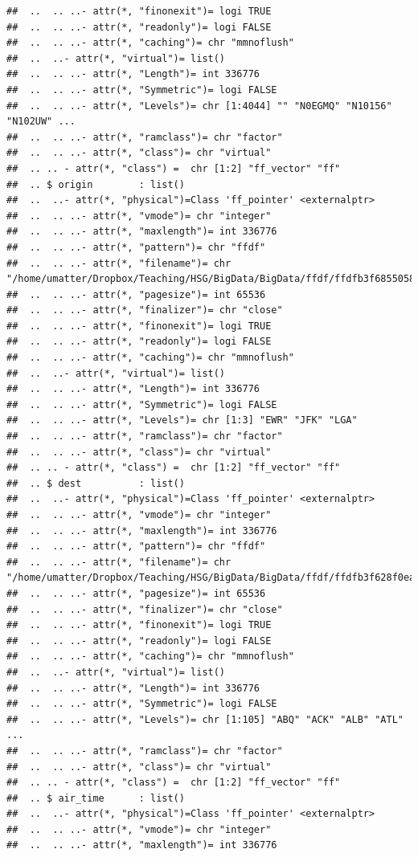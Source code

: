 \documentclass[
  12pt,
]{style/krantz}
\begin{document}
\begin{verbatim}
##  ..  .. ..- attr(*, "finonexit")= logi TRUE
##  ..  .. ..- attr(*, "readonly")= logi FALSE
##  ..  .. ..- attr(*, "caching")= chr "mmnoflush"
##  ..  ..- attr(*, "virtual")= list()
##  ..  .. ..- attr(*, "Length")= int 336776
##  ..  .. ..- attr(*, "Symmetric")= logi FALSE
##  ..  .. ..- attr(*, "Levels")= chr [1:4044] "" "N0EGMQ" "N10156" "N102UW" ...
##  ..  .. ..- attr(*, "ramclass")= chr "factor"
##  ..  .. ..- attr(*, "class")= chr "virtual"
##  .. .. - attr(*, "class") =  chr [1:2] "ff_vector" "ff"
##  .. $ origin        : list()
##  ..  ..- attr(*, "physical")=Class 'ff_pointer' <externalptr> 
##  ..  .. ..- attr(*, "vmode")= chr "integer"
##  ..  .. ..- attr(*, "maxlength")= int 336776
##  ..  .. ..- attr(*, "pattern")= chr "ffdf"
##  ..  .. ..- attr(*, "filename")= chr "/home/umatter/Dropbox/Teaching/HSG/BigData/BigData/ffdf/ffdfb3f68550586.ff"
##  ..  .. ..- attr(*, "pagesize")= int 65536
##  ..  .. ..- attr(*, "finalizer")= chr "close"
##  ..  .. ..- attr(*, "finonexit")= logi TRUE
##  ..  .. ..- attr(*, "readonly")= logi FALSE
##  ..  .. ..- attr(*, "caching")= chr "mmnoflush"
##  ..  ..- attr(*, "virtual")= list()
##  ..  .. ..- attr(*, "Length")= int 336776
##  ..  .. ..- attr(*, "Symmetric")= logi FALSE
##  ..  .. ..- attr(*, "Levels")= chr [1:3] "EWR" "JFK" "LGA"
##  ..  .. ..- attr(*, "ramclass")= chr "factor"
##  ..  .. ..- attr(*, "class")= chr "virtual"
##  .. .. - attr(*, "class") =  chr [1:2] "ff_vector" "ff"
##  .. $ dest          : list()
##  ..  ..- attr(*, "physical")=Class 'ff_pointer' <externalptr> 
##  ..  .. ..- attr(*, "vmode")= chr "integer"
##  ..  .. ..- attr(*, "maxlength")= int 336776
##  ..  .. ..- attr(*, "pattern")= chr "ffdf"
##  ..  .. ..- attr(*, "filename")= chr "/home/umatter/Dropbox/Teaching/HSG/BigData/BigData/ffdf/ffdfb3f628f0eaa8.ff"
##  ..  .. ..- attr(*, "pagesize")= int 65536
##  ..  .. ..- attr(*, "finalizer")= chr "close"
##  ..  .. ..- attr(*, "finonexit")= logi TRUE
##  ..  .. ..- attr(*, "readonly")= logi FALSE
##  ..  .. ..- attr(*, "caching")= chr "mmnoflush"
##  ..  ..- attr(*, "virtual")= list()
##  ..  .. ..- attr(*, "Length")= int 336776
##  ..  .. ..- attr(*, "Symmetric")= logi FALSE
##  ..  .. ..- attr(*, "Levels")= chr [1:105] "ABQ" "ACK" "ALB" "ATL" ...
##  ..  .. ..- attr(*, "ramclass")= chr "factor"
##  ..  .. ..- attr(*, "class")= chr "virtual"
##  .. .. - attr(*, "class") =  chr [1:2] "ff_vector" "ff"
##  .. $ air_time      : list()
##  ..  ..- attr(*, "physical")=Class 'ff_pointer' <externalptr> 
##  ..  .. ..- attr(*, "vmode")= chr "integer"
##  ..  .. ..- attr(*, "maxlength")= int 336776

\end{verbatim}
\end{document}
